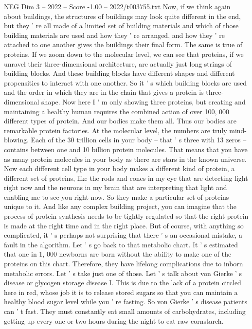 \begin{textsample}{NEG Dim 3 – 2022 – Score -1.00 – 2022/t003755.txt}
Now, if we think again about buildings, the structures of buildings may look quite different in the end, but they ' re all made of a limited set of building materials and which of those building materials are used and how they ' re arranged, and how they ' re attached to one another gives the buildings their final form.
The same is true of proteins.
If we zoom down to the molecular level, we can see that proteins, if we unravel their three-dimensional architecture, are actually just long strings of building blocks.
And these building blocks have different shapes and different propensities to interact with one another.
So it ' s which building blocks are used and the order in which they are in the chain that gives a protein is three-dimensional shape.
Now here I ' m only showing three proteins, but creating and maintaining a healthy human requires the combined action of over 100, 000 different types of protein.
And our bodies make them all.
Thus our bodies are remarkable protein factories.
At the molecular level, the numbers are truly mind-blowing.
Each of the 30 trillion cells in your body -- that ' s three with 13 zeros -- contains between one and 10 billion protein molecules.
That means that you have as many protein molecules in your body as there are stars in the known universe.
Now each different cell type in your body makes a different kind of protein, a different set of proteins, like the rods and cones in my eye that are detecting light right now and the neurons in my brain that are interpreting that light and enabling me to see you right now.
So they make a particular set of proteins unique to it.
And like any complex building project, you can imagine that the process of protein synthesis needs to be tightly regulated so that the right protein is made at the right time and in the right place.
But of course, with anything so complicated, it ' s perhaps not surprising that there ' s an occasional mistake, a fault in the algorithm.
Let ' s go back to that metabolic chart.
It ' s estimated that one in 1, 000 newborns are born without the ability to make one of the proteins on this chart.
Therefore, they have lifelong complications due to inborn metabolic errors.
Let ' s take just one of those.
Let ' s talk about von Gierke ' s disease or glycogen storage disease I.
This is due to the lack of a protein circled here in red, whose job it is to release stored sugars so that you can maintain a healthy blood sugar level while you ' re fasting.
So von Gierke ' s disease patients can ' t fast.
They must constantly eat small amounts of carbohydrates, including getting up every one or two hours during the night to eat raw cornstarch.

\end{textsample}
